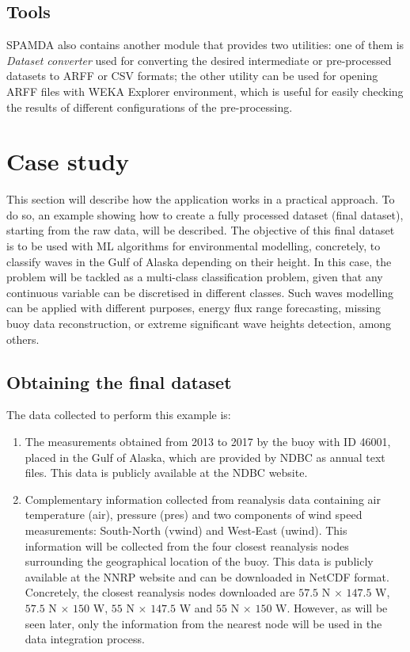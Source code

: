 \documentclass[review]{elsarticle}
\begin{document}
			\subsection{Tools}
			
				SPAMDA also contains another module that provides two utilities: one of them is \textit{Dataset converter} used for converting the desired intermediate or pre-processed datasets to ARFF or CSV formats; the other utility can be used for opening ARFF files with WEKA Explorer environment, which is useful for easily checking the results of different configurations of the pre-processing.
				
	\section{Case study}\label{sec:CaseStudy}
			
		This section will describe how the application works in a practical approach. To do so, an example showing how to create a fully processed dataset (final dataset), starting from the raw data, will be described. The objective of this final dataset is to be used with ML algorithms for environmental modelling, concretely, to classify waves in the Gulf of Alaska depending on their height. In this case, the problem will be tackled as a multi-class classification problem, given that any continuous variable can be discretised in different classes. Such waves modelling can be applied with different purposes, energy flux range forecasting, missing buoy data reconstruction, or extreme significant wave heights detection, among others.
		
		\subsection{Obtaining the final dataset}\label{sec:ObtainingFinalDataset}
		
			The data collected to perform this example is:
			\begin{enumerate}
			\item The measurements obtained from 2013 to 2017 by the buoy with ID 46001, placed in the Gulf of Alaska, which are provided by NDBC as annual text files. This data is publicly available at the NDBC website. 
			\item Complementary information collected from reanalysis data containing air temperature (air), pressure (pres) and two components of wind speed measurements: South-North (vwind) and West-East (uwind). This information will be collected from the four closest reanalysis nodes surrounding the geographical location of the buoy. This data is publicly available at the NNRP website and can be downloaded in NetCDF format. Concretely, the closest reanalysis nodes downloaded are $57.5$ N $\times$ $147.5$ W, $57.5$ N $\times$ $150$ W, $55$ N $\times$ $147.5$ W and $55$ N $\times$ $150$ W. However, as will be seen later, only the information from the nearest node will be used in the data integration process.
			\end{enumerate}
		
\end{document}

